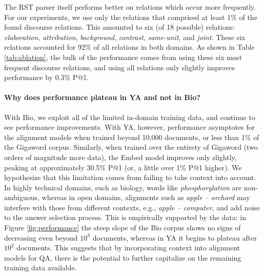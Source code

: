 The RST parser itself performs better on relations which occur more frequently.  For our experiments, we use only the relations that comprised at least 1\% of the found discourse relations.  This amounted to six (of 18 possible) relations: \emph{elaboration}, \emph{attribution}, \emph{background}, \emph{contrast}, \emph{same-unit}, and \emph{joint}.
These six relations accounted for 92\% of all relations in both domains. 
As shown in Table \ref{tab:ablation}, the bulk of the performance comes from using these six most frequent discourse relations, and using all relations only slightly improves performance by 0.3\% P@1.


\paragraph{Why does performance plateau in YA and not in Bio?}

With Bio, we exploit all of the limited in-domain training data, and continue to see performance improvements.  With YA, however, performance asymptotes for the alignment models when trained beyond 10,000 documents, or less than 1\% of the Gigaword corpus.  Similarly, when trained over the entirety of Gigaword (two orders of magnitude more data), the Embed model improves only slightly, peaking at approximately 30.5\% P@1 (or, a little over 1\% P@1 higher).  
We hypothesize that this limitation comes from failing to take context into account. 
In highly technical domains, such as biology, words like {\em phosphorylation} are non-ambiguous, whereas 
in open domains, alignments such as {\em apple -- \mbox{orchard}} may interfere with those from different contexts, e.g., {\em apple -- computer}, and add noise to the answer selection process.  
This is empirically supported by the data: in Figure \ref{fig:performance} the steep slope of the Bio corpus shows no signs of decreasing even beyond $10^{3}$ documents, whereas in YA it begins to plateau after $10^{2}$ documents.  This suggests that by incorporating context into alignment models for QA, there is the potential to further capitalize on the remaining training data available. 


